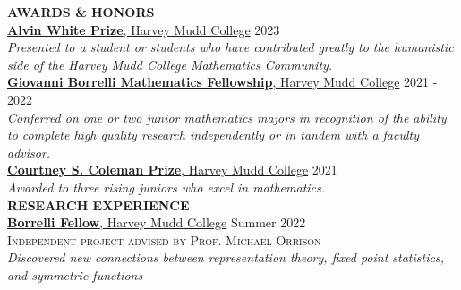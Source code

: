 \documentclass[11pt]{article}
\newcommand{\hdr}[1]{\textcolor{blue(ryb)}{\textbf{#1}}}
\newcommand{\role}[3]{\underline{\textbf{#1}, {#2}} \hfill #3}
\begin{document}
\medskip
\hdr{AWARDS \& HONORS}\\
\role{Alvin White Prize}{Harvey Mudd College}{2023}\\
\textit{Presented to a student or students who have contributed greatly to the humanistic side of the Harvey Mudd College Mathematics Community.}\\
\role{Giovanni Borrelli Mathematics Fellowship}{Harvey Mudd College}{2021 - 2022}\\
\textit{Conferred on one or two junior mathematics majors in recognition of the ability to complete high quality research independently or in tandem with a faculty advisor.}\\
\role{Courtney S. Coleman Prize}{Harvey Mudd College}{2021}\\
\textit{Awarded to three rising juniors who excel in mathematics.}
\bigskip\\
\hdr{RESEARCH EXPERIENCE}\\
\role{Borrelli Fellow}{Harvey Mudd College}{Summer 2022}\\
\textsc{Independent project advised by Prof. Michael Orrison}\\
\textit{Discovered new connections between representation theory, fixed point statistics, and symmetric functions}\\
\end{document}
